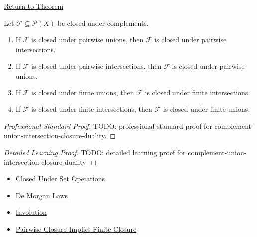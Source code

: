 \newpage
{}
\label{prf:complement-union-intersection-closure-duality}

\begin{remark*}[Return]
\hyperref[thm:complement-union-intersection-closure-duality]{Return to Theorem}
\end{remark*}

\begin{theorem*}
Let \(\mathcal F\subseteq\mathcal P(X)\) be closed under complements.
\begin{enumerate}[label=(\roman*)]
\item If \(\mathcal F\) is closed under pairwise unions, then
      \(\mathcal F\) is closed under pairwise intersections.
\item If \(\mathcal F\) is closed under pairwise intersections, then
      \(\mathcal F\) is closed under pairwise unions.
\item If \(\mathcal F\) is closed under finite unions, then
      \(\mathcal F\) is closed under finite intersections.
\item If \(\mathcal F\) is closed under finite intersections, then
      \(\mathcal F\) is closed under finite unions.
\end{enumerate}
\end{theorem*}

\begin{proof}[Professional Standard Proof]
\LRAProofBodyStart
TODO: professional standard proof for complement-union-intersection-closure-duality.
\end{proof}

\begin{proof}[Detailed Learning Proof]
\LRAProofBodyStart
TODO: detailed learning proof for complement-union-intersection-closure-duality.
\end{proof}

\begin{remark*}
\end{remark*}

\begin{dependencies}
\begin{itemize}
  \item \hyperref[def:closed-under-set-operation-vocabulary]{Closed Under Set Operations}
  \item \hyperref[thm:de-morgan]{De Morgan Laws}
  \item \hyperref[thm:involution]{Involution}
  \item \hyperref[thm:pairwise-closure-implies-finite-closure]{Pairwise Closure Implies Finite Closure}
\end{itemize}
\end{dependencies}

\clearpage
